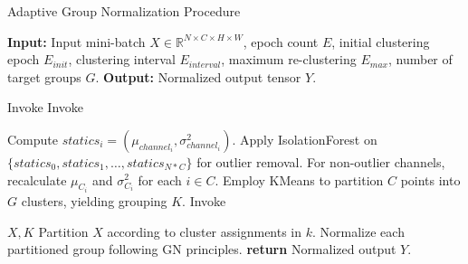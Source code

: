 \begin{algorithm}
\caption{Adaptive Group Normalization Procedure}
\begin{algorithmic}[1]
\State \textbf{Input:} Input mini-batch $X \in \mathbb{R}^{N \times C \times H \times W}$, epoch count $E$, initial clustering epoch $E_{init}$, clustering interval $E_{interval}$, maximum re-clustering $E_{max}$, number of target groups $G$.
\State \textbf{Output:} Normalized output tensor $Y$.

        \State Invoke 
    \Else
        \State Invoke 
    \EndIf
\EndProcedure

     
        \State Compute $statics_i = \left(\mu_{channel_i}, \sigma^2_{channel_i}\right)$. 
    \EndFor
    \State Apply IsolationForest on $\{ statics_0, statics_1, \ldots, statics_{N*C} \}$ for outlier removal.
    \State For non-outlier channels, recalculate $\mu_{C_i}$ and $\sigma^2_{C_i}$ for each $i \in C$.
    \State Employ KMeans to partition $C$ points into $G$ clusters, yielding grouping $K$.
    \State Invoke 
\EndProcedure

 {$X, K$}
        \State Partition $X$ according to cluster assignments in $k$.
        \State Normalize each partitioned group following GN principles.
    \EndFor
    \State \textbf{return} Normalized output $Y$.
\EndProcedure

\end{algorithmic}
\end{algorithm}